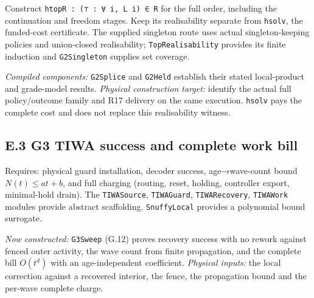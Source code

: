 \documentclass[
]{article}
\begin{document}
Construct
\texttt{h\allowbreak{}t\allowbreak{}o\allowbreak{}p\allowbreak{}R\allowbreak{} \allowbreak{}:\allowbreak{} \allowbreak{}(\allowbreak{}⊤\allowbreak{} \allowbreak{}:\allowbreak{} \allowbreak{}∀\allowbreak{} \allowbreak{}i\allowbreak{},\allowbreak{} \allowbreak{}L\allowbreak{} \allowbreak{}i\allowbreak{})\allowbreak{} \allowbreak{}∈\allowbreak{} \allowbreak{}R}
for the full order, including the continuation and freedom stages. Keep
its realisability separate from \texttt{hsolv}, the funded-cost
certificate. The supplied singleton route uses actual singleton-keeping
policies and union-closed realisability; \texttt{TopRealisability}
provides its finite induction and \texttt{G2Singleton} supplies set
coverage.

\emph{Compiled components:} \texttt{G2Splice} and \texttt{G2Held}
establish their stated local-product and grade-model results.
\emph{Physical construction target:} identify the actual full
policy/outcome family and R17 delivery on the same execution.
\texttt{hsolv} pays the complete cost and does not replace this
realisability witness.

\subsection{E.3 G3 TIWA success and complete work
bill}\label{e.3-g3-tiwa-success-and-complete-work-bill}

Requires: physical guard installation, decoder success, age→wave-count
bound \(N(t) \le at+b\), and full charging (routing, reset, holding,
controller export, minimal-hold drain). The \texttt{TIWASource},
\texttt{TIWAGuard}, \texttt{TIWARecovery}, \texttt{TIWAWork} modules
provide abstract scaffolding. \texttt{SnuffyLocal} provides a polynomial
bound surrogate.

\emph{Now constructed:} \texttt{G3Sweep} (G.12) proves recovery success
with no rework against fenced outer activity, the wave count from finite
propagation, and the complete bill \(O(t^{d})\) with an age-independent
coefficient. \emph{Physical inputs:} the local correction against a
recovered interior, the fence, the propagation bound and the per-wave
complete charge.
\end{document}
